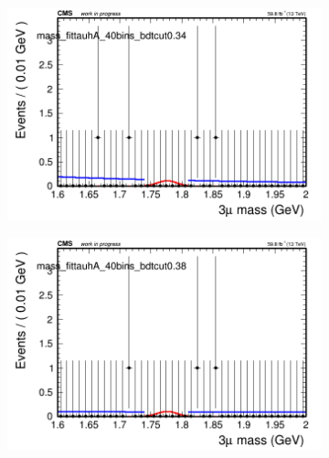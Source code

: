 \begin{figure}[H]
\begin{subfigure}{0.2\textwidth}
        \caption{}
    \end{subfigure}
    \begin{subfigure}{0.2\textwidth}
        \includegraphics[width=\textwidth]{power_law/plots/tauhA/massfit_tauhA_40bins_bdtcut0.34.png}
        \caption{}
    \end{subfigure}
    \begin{subfigure}{0.2\textwidth}
        \includegraphics[width=\textwidth]{power_law/plots/tauhA/massfit_tauhA_40bins_bdtcut0.38.png}
        \caption{}
    \end{subfigure}
    \begin{subfigure}{0.2\textwidth}

\end{subfigure}
\end{figure}
